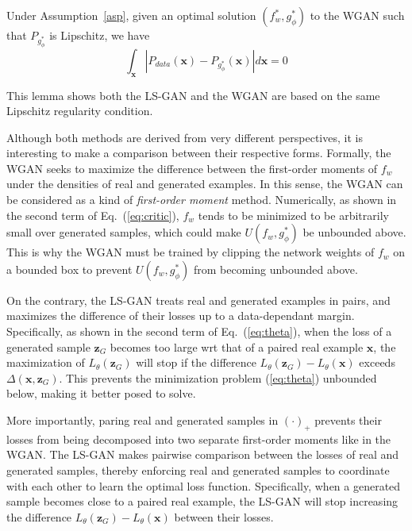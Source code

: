 \begin{lemma}\label{lem:wgan}
{Under Assumption~\ref{asp}, given an optimal solution $(f_w^*,g_\phi^*)$ to the WGAN such that $P_{g_\phi^*}$ is Lipschitz, we have
$$
\int_{\mathbf x}|P_{data}(\mathbf x)-P_{g_\phi^*}(\mathbf x)|d\mathbf x=0
$$}
\end{lemma}

This lemma shows both the LS-GAN and the WGAN are based on the same Lipschitz regularity condition.

Although both methods are derived from very different perspectives, it is interesting to make a comparison between their respective forms. Formally, the WGAN seeks to maximize the difference between the first-order moments of $f_w$ under the densities of real and generated examples. In this sense, the WGAN can be considered as a kind of {\em first-order moment} method. Numerically, as shown in the second term of Eq.~(\ref{eq:critic}), $f_w$ tends to be minimized to be arbitrarily small over generated samples, which could make $U(f_w,g_\phi^*)$ be unbounded above. This is why the WGAN must be trained by clipping the network weights of $f_w$ on a bounded box to prevent $U(f_w,g_\phi^*)$ from becoming unbounded above.

On the contrary, the LS-GAN treats real and generated examples in pairs, and maximizes the difference of their losses up to a data-dependant margin. Specifically, as shown in the second term of Eq.~(\ref{eq:theta}), when the loss of a generated sample $\mathbf z_G$ becomes too large wrt that of a paired real example $\mathbf x$, the maximization of $L_\theta(\mathbf z_G)$ will stop if the difference $L_\theta(\mathbf z_G)-L_\theta(\mathbf x)$ exceeds $\Delta(\mathbf x, \mathbf z_G)$. This prevents the minimization problem (\ref{eq:theta}) unbounded below, making it better posed to solve.

More importantly, paring real and generated samples in $(\cdot)_+$ prevents their losses from being decomposed into two separate first-order moments like in the WGAN. The LS-GAN makes pairwise comparison between the losses of real and generated samples, thereby enforcing real and generated samples to coordinate with each other to learn the optimal loss function. Specifically, when a generated sample becomes close to a paired real example, the LS-GAN will stop increasing the difference $L_\theta(\mathbf z_G)-L_\theta(\mathbf x)$ between their losses.


